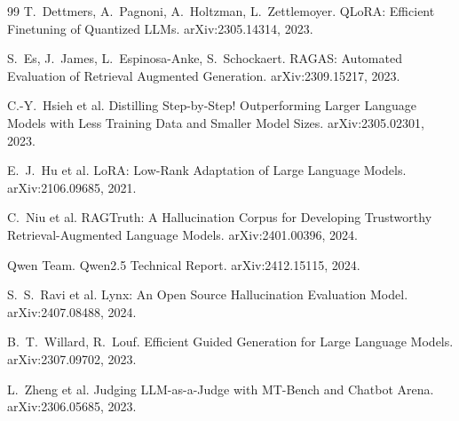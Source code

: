 \documentclass{zapiski}
\begin{document}
\begin{thebibliography}{99}
T.~Dettmers, A.~Pagnoni, A.~Holtzman, L.~Zettlemoyer.
QLoRA: Efficient Finetuning of Quantized LLMs.
arXiv:2305.14314, 2023.

S.~Es, J.~James, L.~Espinosa-Anke, S.~Schockaert.
RAGAS: Automated Evaluation of Retrieval Augmented Generation.
arXiv:2309.15217, 2023.

C.-Y.~Hsieh et al.
Distilling Step-by-Step! Outperforming Larger Language Models with Less
Training Data and Smaller Model Sizes.
arXiv:2305.02301, 2023.

E.~J.~Hu et al.
LoRA: Low-Rank Adaptation of Large Language Models.
arXiv:2106.09685, 2021.

C.~Niu et al.
RAGTruth: A Hallucination Corpus for Developing Trustworthy
Retrieval-Augmented Language Models.
arXiv:2401.00396, 2024.

Qwen Team.
Qwen2.5 Technical Report.
arXiv:2412.15115, 2024.

S.~S.~Ravi et al.
Lynx: An Open Source Hallucination Evaluation Model.
arXiv:2407.08488, 2024.

B.~T.~Willard, R.~Louf.
Efficient Guided Generation for Large Language Models.
arXiv:2307.09702, 2023.

L.~Zheng et al.
Judging LLM-as-a-Judge with MT-Bench and Chatbot Arena.
arXiv:2306.05685, 2023.
\end{thebibliography}
\end{document}
